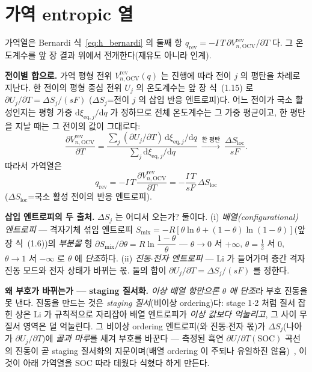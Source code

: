 \documentclass[11pt,a4paper]{article}
\newcommand{\dd}{\mathrm{d}}
\newcommand{\eq}{\mathrm{eq}}
\newcommand{\OCV}{\mathrm{OCV}}
\newcommand{\rev}{\mathrm{rev}}
\begin{document}
\section{가역 entropic 열}\label{sec:h_rev}
가역열은 Bernardi 식~\eqref{eq:h_bernardi} 의 둘째 항 $q_\rev=-I\,T\,\partial V_{n,\OCV}^\rev/\partial T$ 다. 그
온도계수를 앞 장 결과 위에서 전개한다(재유도 아니라 인계).

\textbf{전이별 합으로.} 가역 평형 전위 $V_{n,\OCV}^\rev(q)$ 는 진행에 따라 전이 $j$ 의 평탄을 차례로 지난다. 한
전이의 평형 중심 전위 $U_j$ 의 온도계수는 앞 장 식~(1.15) 로 $\partial U_j/\partial T=\Delta S_j/(sF)$
($\Delta S_j$=전이 $j$ 의 삽입 반응 엔트로피)다. 어느 전이가 국소 활성인지는 평형 가중 $\dd\xi_{\eq,j}/\dd q$ 가
정하므로 전체 온도계수는 그 가중 평균이고, 한 평탄을 지날 때는 그 전이의 값이 그대로다:
\begin{equation}
\frac{\partial V_{n,\OCV}^\rev}{\partial T}=\frac{\sum_j(\partial U_j/\partial T)\,\dd\xi_{\eq,j}/\dd q}
{\sum_j\dd\xi_{\eq,j}/\dd q}\ \xrightarrow{\text{한 평탄}}\ \frac{\Delta S_\mathrm{loc}}{sF}.
\label{eq:h_dVdT}
\end{equation}
따라서 가역열은
\begin{equation}
\boxed{\;q_\rev=-I\,T\,\frac{\partial V_{n,\OCV}^\rev}{\partial T}=-\frac{I\,T}{sF}\,\Delta S_\mathrm{loc}\;}
\label{eq:h_qrev}
\end{equation}
($\Delta S_\mathrm{loc}$=국소 활성 전이의 반응 엔트로피).

\textbf{삽입 엔트로피의 두 출처.} $\Delta S_j$ 는 어디서 오는가? 둘이다. (i) \emph{배열(configurational) 엔트로피}
— 격자기체 섞임 엔트로피 $S_\mathrm{mix}=-R[\theta\ln\theta+(1-\theta)\ln(1-\theta)]$(앞 장 식~(1.6))의 \emph{부분몰}
형 $\partial S_\mathrm{mix}/\partial\theta=R\ln\dfrac{1-\theta}{\theta}$ — $\theta\to0$ 서 $+\infty$, $\theta=\tfrac12$
서 $0$, $\theta\to1$ 서 $-\infty$ 로 $\theta$ 에 \emph{단조}하다. (ii) \emph{진동$\cdot$전자 엔트로피} — Li 가 들어가며
층간 격자 진동 모드와 전자 상태가 바뀌는 몫. 둘의 합이 $\partial U_j/\partial T=\Delta S_j/(sF)$ 를 정한다.

\textbf{왜 부호가 바뀌는가 — staging 질서화.} \emph{이상 배열 항만으론 $\theta$ 에 단조}라 부호 진동을 못 낸다.
진동을 만드는 것은 \emph{staging 질서}(비이상 ordering)다: stage 1$\cdot$2 처럼 질서 잡힌 상은 Li 가 규칙적으로
자리잡아 배열 엔트로피가 \emph{이상 값보다 억눌리고}, 그 사이 무질서 영역은 덜 억눌린다. 그 비이상 ordering
엔트로피(와 진동$\cdot$전자 몫)가 $\Delta S_j$(나아가 $\partial U_j/\partial T$)에 \emph{골과 마루}를 새겨 부호를
바꾼다 — 측정된 흑연 $\partial U/\partial T(\mathrm{SOC})$ 곡선의 진동이 곧 staging 질서화의 지문이며(배열 ordering
이 주되나 유일하진 않음)~\cite{reynier2004}, 이것이 아래 가역열을 SOC 따라 데웠다 식혔다 하게 만든다.
\end{document}
